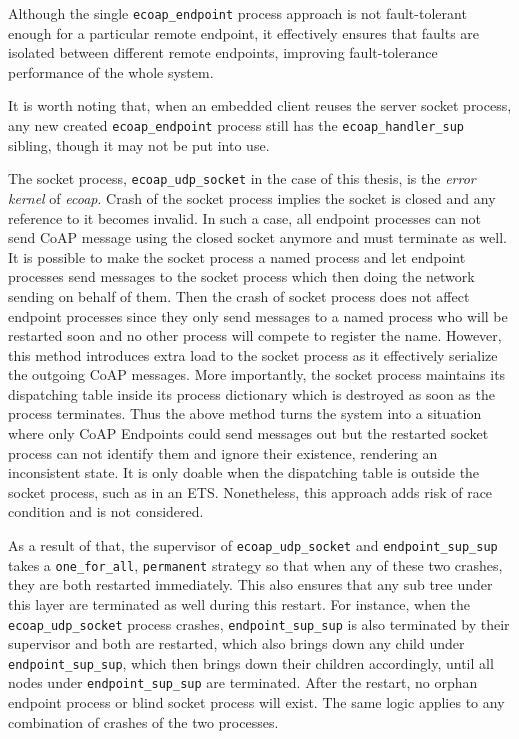 Although the single \verb|ecoap_endpoint| process approach is not fault-tolerant enough for a particular remote endpoint, it effectively ensures that faults are isolated between different remote endpoints, improving fault-tolerance performance of the whole system. 

It is worth noting that, when an embedded client reuses the server socket process, any new created \verb|ecoap_endpoint| process still has the \verb|ecoap_handler_sup| sibling, though it may not be put into use. 

The socket process, \verb|ecoap_udp_socket| in the case of this thesis, is the \textit{error kernel} of \textit{ecoap}. Crash of the socket process implies the socket is closed and any reference to it becomes invalid. In such a case, all endpoint processes can not send CoAP message using the closed socket anymore and must terminate as well. It is possible to make the socket process a named process and let endpoint processes send messages to the socket process which then doing the network sending on behalf of them. Then the crash of socket process does not affect endpoint processes since they only send messages to a named process who will be restarted soon and no other process will compete to register the name. However, this method introduces extra load to the socket process as it effectively serialize the outgoing CoAP messages. More importantly, the socket process maintains its dispatching table inside its process dictionary which is destroyed as soon as the process terminates. Thus the above method turns the system into a situation where only CoAP Endpoints could send messages out but the restarted socket process can not identify them and ignore their existence, rendering an inconsistent state. It is only doable when the dispatching table is outside the socket process, such as in an ETS. Nonetheless, this approach adds risk of race condition and is not considered. 

As a result of that, the supervisor of \verb|ecoap_udp_socket| and \verb|endpoint_sup_sup| takes a \verb|one_for_all|, \verb|permanent| strategy so that when any of these two crashes, they are both restarted immediately. This also ensures that any sub tree under this layer are terminated as well during this restart. For instance, when the \verb|ecoap_udp_socket| process crashes, \verb|endpoint_sup_sup| is also terminated by their supervisor and both are restarted, which also brings down any child under \verb|endpoint_sup_sup|, which then brings down their children accordingly, until all nodes under \verb|endpoint_sup_sup| are terminated. After the restart, no orphan endpoint process or blind socket process will exist. The same logic applies to any combination of crashes of the two processes. 

